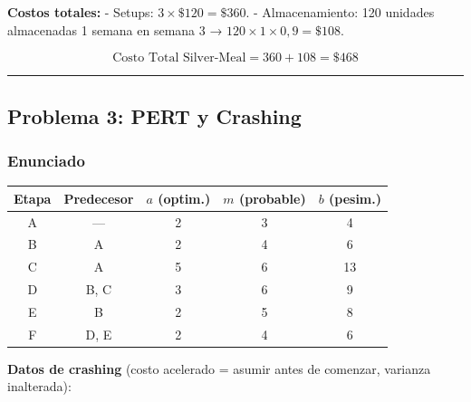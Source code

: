 \documentclass[
]{article}
\begin{document}
\textbf{Costos totales:} - Setups: \(3 \times \$120 = \$360\). -
Almacenamiento: 120 unidades almacenadas 1 semana en semana 3 →
\(120 \times 1 \times 0{,}9 = \$108\).

\[\boxed{\text{Costo Total Silver-Meal} = 360 + 108 = \$468}\]

\begin{center}\rule{0.5\linewidth}{0.5pt}\end{center}

\hypertarget{problema-3-pert-y-crashing}{%
\subsection{Problema 3: PERT y
Crashing}\label{problema-3-pert-y-crashing}}

\hypertarget{enunciado-2}{%
\subsubsection{Enunciado}\label{enunciado-2}}

\begin{longtable}[]{@{}ccccc@{}}
\toprule\noalign{}
Etapa & Predecesor & \(a\) (optim.) & \(m\) (probable) & \(b\)
(pesim.) \\
\midrule\noalign{}
\endhead
\bottomrule\noalign{}
\endlastfoot
A & --- & 2 & 3 & 4 \\
B & A & 2 & 4 & 6 \\
C & A & 5 & 6 & 13 \\
D & B, C & 3 & 6 & 9 \\
E & B & 2 & 5 & 8 \\
F & D, E & 2 & 4 & 6 \\
\end{longtable}

\textbf{Datos de crashing} (costo acelerado = asumir antes de comenzar,
varianza inalterada):
\end{document}
